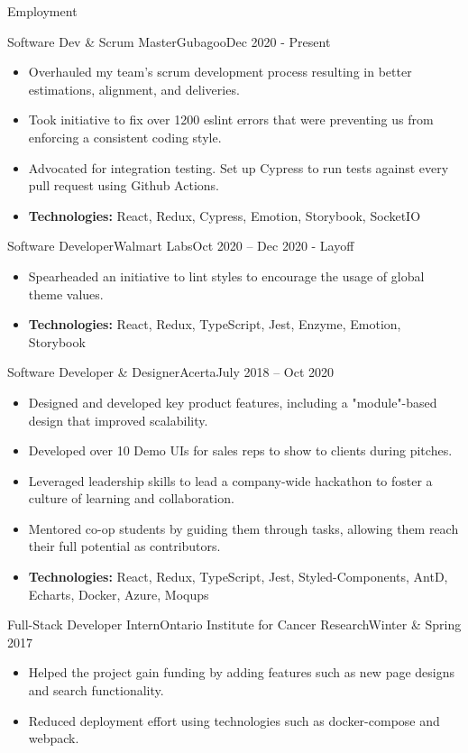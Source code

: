 \documentclass[]{mcdowellcv}
\begin{document}
	\begin{cvsection}{Employment}
		\begin{cvsubsection}{Software Dev \& Scrum Master}{Gubagoo}{Dec 2020 - Present}
 			\begin{itemize}
				\item Overhauled my team's scrum development process resulting in better estimations, alignment, and deliveries.
				\item Took initiative to fix over 1200 eslint errors that were preventing us from enforcing a consistent coding style.
				\item Advocated for integration testing. Set up Cypress to run tests against every pull request using Github Actions.
				\item \textbf{Technologies:} React, Redux, Cypress, Emotion, Storybook, SocketIO
			\end{itemize}
		\end{cvsubsection}
		\begin{cvsubsection}{Software Developer}{Walmart Labs}{Oct 2020 -- Dec 2020 - Layoff}
			\begin{itemize}
				\item Spearheaded an initiative to lint styles to encourage the usage of global theme values.
				\item \textbf{Technologies:} React, Redux, TypeScript, Jest, Enzyme, Emotion, Storybook
			\end{itemize}
		\end{cvsubsection}
		\begin{cvsubsection}{Software Developer \& Designer}{Acerta}{July 2018 -- Oct 2020}
			\begin{itemize}
				\item Designed and developed key product features, including a "module"-based design that improved scalability.
				\item Developed over 10 Demo UIs for sales reps to show to clients during pitches.
				\item Leveraged leadership skills to lead a company-wide hackathon to foster a culture of learning and collaboration.
				\item Mentored co-op students by guiding them through tasks, allowing them reach their full potential as contributors.
				\item \textbf{Technologies:} React, Redux, TypeScript, Jest, Styled-Components, AntD, Echarts, Docker, Azure, Moqups
			\end{itemize}
		\end{cvsubsection}

		\begin{cvsubsection}{Full-Stack Developer Intern}{Ontario Institute for Cancer Research}{Winter \& Spring 2017}
			\begin{itemize}
				\item Helped the project gain funding by adding features such as new page designs and search functionality.
				\item Reduced deployment effort using technologies such as docker-compose and webpack.
			\end{itemize}
		\end{cvsubsection}
	\end{cvsection}
\end{document}
